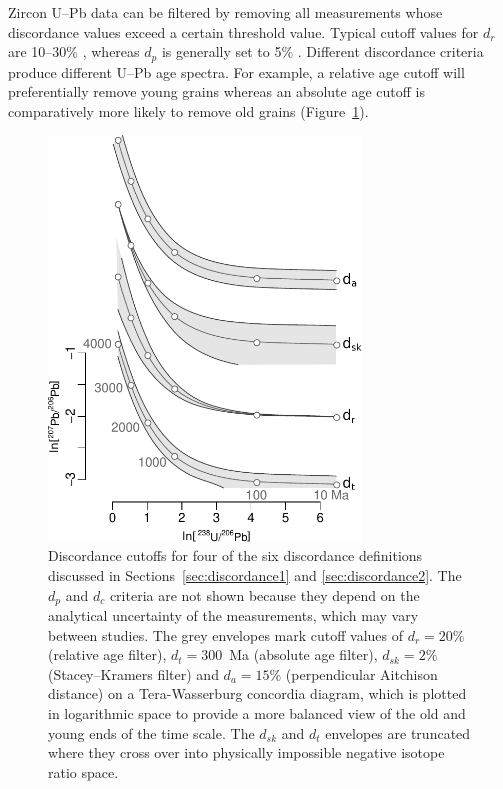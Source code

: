 \documentclass{article}
\begin{document}
Zircon U--Pb data can be filtered by removing all measurements whose
discordance values exceed a certain threshold value. Typical cutoff
values for $d_r$ are 10--30\% \citep{gehrels2011}, whereas $d_p$ is
generally set to 5\% \citep{spencer2016}. Different discordance
criteria produce different U--Pb age spectra. For example, a relative
age cutoff will preferentially remove young grains whereas an absolute
age cutoff is comparatively more likely to remove old grains
(Figure~\ref{fig:agediscordance}).

\begin{figure}[t]
  \includegraphics[width=8.3cm]{TW-option-1234.pdf}
  \caption{Discordance cutoffs for four of the six discordance
    definitions discussed in Sections~\ref{sec:discordance1} and
    \ref{sec:discordance2}. The $d_{p}$ and $d_c$ criteria are not
    shown because they depend on the analytical uncertainty of the
    measurements, which may vary between studies. The grey envelopes
    mark cutoff values of $d_r=20\%$ (relative age filter),
    $d_t=300$~Ma (absolute age filter), $d_{sk}=2\%$ (Stacey--Kramers
    filter) and $d_{a}=15\%$ (perpendicular Aitchison distance) on a
    Tera-Wasserburg concordia diagram, which is plotted in logarithmic
    space to provide a more balanced view of the old and young ends of
    the time scale. The $d_{sk}$ and $d_t$ envelopes are truncated
    where they cross over into physically impossible negative isotope
    ratio space.}
  \label{fig:agediscordance}
\end{figure}
\end{document}
